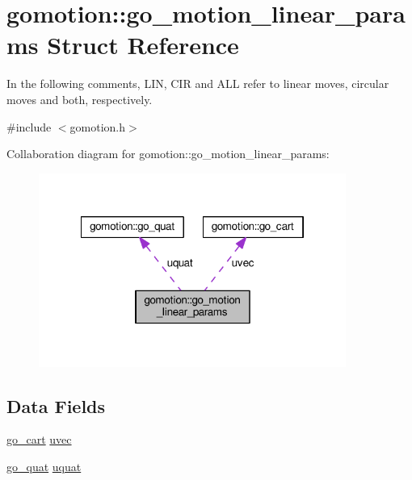 \hypertarget{structgomotion_1_1go__motion__linear__params}{\section{gomotion\-:\-:go\-\_\-motion\-\_\-linear\-\_\-params Struct Reference}
\label{structgomotion_1_1go__motion__linear__params}
}


In the following comments, L\-I\-N, C\-I\-R and A\-L\-L refer to linear moves, circular moves and both, respectively.  




{\ttfamily \#include $<$gomotion.\-h$>$}



Collaboration diagram for gomotion\-:\-:go\-\_\-motion\-\_\-linear\-\_\-params\-:\nopagebreak
\begin{figure}[H]
\begin{center}
\leavevmode
\includegraphics[width=285pt]{d6/dbf/structgomotion_1_1go__motion__linear__params__coll__graph}
\end{center}
\end{figure}
\subsection*{Data Fields}
\begin{DoxyCompactItemize}
\item 
\hyperlink{structgomotion_1_1go__cart}{go\-\_\-cart} \hyperlink{structgomotion_1_1go__motion__linear__params_ab1865f783998b55efb3c97f62e6a4f7d}{uvec}
\item 
\hyperlink{structgomotion_1_1go__quat}{go\-\_\-quat} \hyperlink{structgomotion_1_1go__motion__linear__params_af354e180468997cc31fca9f21a9bc325}{uquat}
\end{DoxyCompactItemize}


